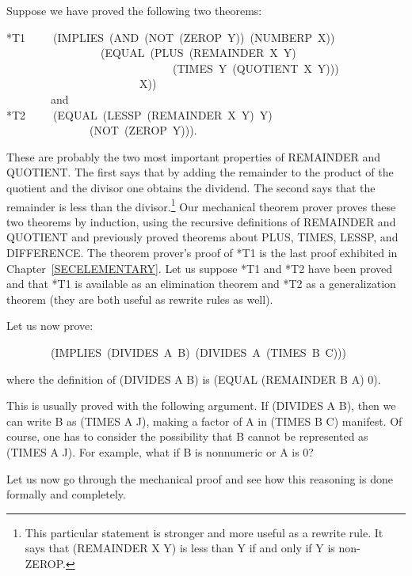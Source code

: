 \documentclass[11pt]{book}
\newenvironment{pubasis}{\begin{flushleft}\ttfamily\small}{\normalsize\rmfamily\end{flushleft}}
\begin{document}
Suppose we have proved the following two theorems:
\begin{pubasis}
*T1~~~~~(IMPLIES~(AND~(NOT~(ZEROP~Y))~(NUMBERP~X))\\
~~~~~~~~~~~~~~~~~(EQUAL~(PLUS~(REMAINDER~X~Y)\\
~~~~~~~~~~~~~~~~~~~~~~~~~~~~~~(TIMES~Y~(QUOTIENT~X~Y)))\\
~~~~~~~~~~~~~~~~~~~~~~~~X))\\

~~~~~~~~and\\

*T2~~~~~(EQUAL~(LESSP~(REMAINDER~X~Y)~Y)\\
~~~~~~~~~~~~~~~(NOT~(ZEROP~Y))).\\
\end{pubasis}
These are probably the two most important properties of REMAINDER
and QUOTIENT.  The first says that by adding the remainder to the
product of the quotient and the divisor one obtains the dividend.
The second says that the remainder is less than the divisor.\footnote{This particular statement is stronger and  more useful as a rewrite rule.  It says that (REMAINDER X Y) is less than Y if and only if Y is non-ZEROP.}
Our mechanical theorem prover proves these two theorems by induction,
using the recursive definitions of REMAINDER and QUOTIENT and
previously proved theorems about PLUS, TIMES, LESSP, and DIFFERENCE.
The theorem prover's proof of *T1 is the last proof exhibited in
Chapter~\ref{SECELEMENTARY}.  Let
us suppose *T1 and *T2 have been proved and that
*T1 is available as an elimination theorem and *T2
as a generalization theorem (they are both useful as rewrite rules as well).

Let us now prove:
\begin{pubasis}
~~~~~~~~(IMPLIES~(DIVIDES~A~B)~(DIVIDES~A~(TIMES~B~C)))\\
\end{pubasis}
where the definition of (DIVIDES A B) is (EQUAL (REMAINDER B A) 0).

This is usually proved with the following argument.  If (DIVIDES A B), then we can
write B as (TIMES A J), making a factor of A in (TIMES B C) manifest.
Of course, one has to consider the possibility that B cannot be represented
as (TIMES A J).  For example, what if B is nonnumeric or A is 0?

Let us now go through the mechanical proof and see how this reasoning is
done  formally and completely.
\end{document}
